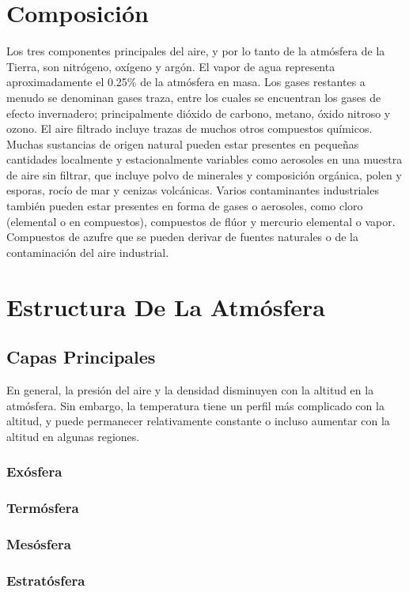 \documentclass[12pt]{article}
\begin{document}
\section{Composición}
	Los tres componentes principales del aire, y por lo tanto de la atmósfera de la Tierra, son nitrógeno, oxígeno y argón. El vapor de agua representa aproximadamente el 0.25\% de la atmósfera en masa. Los gases restantes a menudo se denominan gases traza, entre los cuales se encuentran los gases de efecto invernadero; principalmente dióxido de carbono, metano, óxido nitroso y ozono. El aire filtrado incluye trazas de muchos otros compuestos químicos. Muchas sustancias de origen natural pueden estar presentes en pequeñas cantidades localmente y estacionalmente variables como aerosoles en una muestra de aire sin filtrar, que incluye polvo de minerales y composición orgánica, polen y esporas, rocío de mar y cenizas volcánicas. Varios contaminantes industriales también pueden estar presentes en forma de gases o aerosoles, como cloro (elemental o en compuestos), compuestos de flúor y mercurio elemental o vapor. Compuestos de azufre que se pueden derivar de fuentes naturales o de la contaminación del aire industrial.
\section{Estructura De La Atmósfera}

\subsection{Capas Principales}
En general, la presión del aire y la densidad disminuyen con la altitud en la atmósfera. Sin embargo, la temperatura tiene un perfil más complicado con la altitud, y puede permanecer relativamente constante o incluso aumentar con la altitud en algunas regiones. 
\subsubsection{Exósfera}

\subsubsection{Termósfera}

\subsubsection{Mesósfera}

\subsubsection{Estratósfera}
\end{document}
